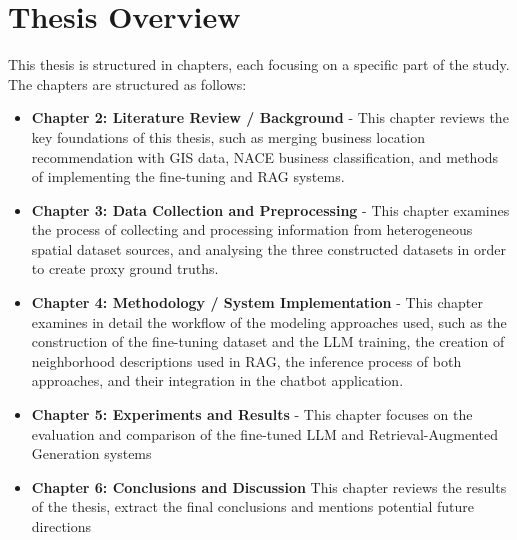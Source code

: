 \section{Thesis Overview}

This thesis is structured in chapters, each focusing on a specific part of the study. The chapters are structured as follows:

\begin{itemize}
    \item \textbf{Chapter 2: Literature Review / Background} - This chapter reviews the key foundations of this thesis, such as merging business location recommendation with GIS data, NACE business classification, and methods of implementing the fine-tuning and RAG systems.

    \item \textbf{Chapter 3: Data Collection and Preprocessing} - This chapter examines the process of collecting and processing information from heterogeneous spatial dataset sources, and analysing the three constructed datasets in order to create proxy ground truths.

    \item \textbf{Chapter 4: Methodology / System Implementation} - This chapter examines in detail the workflow of the modeling approaches used, such as the construction of the fine-tuning dataset and the LLM training, the creation of neighborhood descriptions used in RAG, the inference process of both approaches, and their integration in the chatbot application.

    \item \textbf{Chapter 5: Experiments and Results} - This chapter focuses on the evaluation and comparison of the fine-tuned LLM and Retrieval-Augmented Generation systems

    \item \textbf{Chapter 6: Conclusions and Discussion} This chapter reviews the results of the thesis, extract the final conclusions and mentions potential future directions
\end{itemize}

